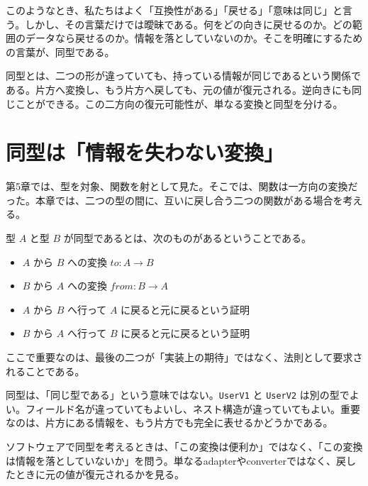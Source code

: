 このようなとき、私たちはよく「互換性がある」「戻せる」「意味は同じ」と言う。しかし、その言葉だけでは曖昧である。何をどの向きに戻せるのか。どの範囲のデータなら戻せるのか。情報を落としていないのか。そこを明確にするための言葉が、同型である。

\begin{intuitionbox}
同型とは、二つの形が違っていても、持っている情報が同じであるという関係である。片方へ変換し、もう片方へ戻しても、元の値が復元される。逆向きにも同じことができる。この二方向の復元可能性が、単なる変換と同型を分ける。
\end{intuitionbox}


\section{同型は「情報を失わない変換」}
\label{sec:ch06-information-preserving}

第5章では、型を対象、関数を射として見た。そこでは、関数は一方向の変換だった。本章では、二つの型の間に、互いに戻し合う二つの関数がある場合を考える。

\begin{definitionbox}
型 $A$ と型 $B$ が同型であるとは、次のものがあるということである。

\begin{itemize}
\item $A$ から $B$ への変換 $\mathit{to} : A \to B$
\item $B$ から $A$ への変換 $\mathit{from} : B \to A$
\item $A$ から $B$ へ行って $A$ に戻ると元に戻るという証明
\item $B$ から $A$ へ行って $B$ に戻ると元に戻るという証明
\end{itemize}

ここで重要なのは、最後の二つが「実装上の期待」ではなく、法則として要求されることである。
\end{definitionbox}

同型は、「同じ型である」という意味ではない。\texttt{UserV1} と \texttt{UserV2} は別の型でよい。フィールド名が違っていてもよいし、ネスト構造が違っていてもよい。重要なのは、片方にある情報を、もう片方でも完全に表せるかどうかである。

\begin{softwarebox}
ソフトウェアで同型を考えるときは、「この変換は便利か」ではなく、「この変換は情報を落としていないか」を問う。単なるadapterやconverterではなく、戻したときに元の値が復元されるかを見る。
\end{softwarebox}


